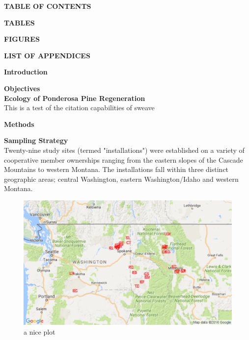 \documentclass[10pt, letterpaper, fleqn]{article}
\begin{document}
\newpage
\large 
\begin{center}
\textbf{TABLE OF CONTENTS}\\[1pt]
\end{center}
\normalsize

\newpage
\large 
\begin{center}
\textbf{TABLES}\\[1pt]
\end{center}
\normalsize
\listoftables
\normalsize

\newpage
\large 
\begin{center}
\textbf{FIGURES}\\[1pt]
\end{center}
\normalsize
\listoffigures

\newpage
\large 
\begin{center}
\textbf{LIST OF APPENDICES}\\[1pt]
\end{center}
\normalsize

\newpage
\large 
\begin{center}
\textbf{Introduction}\\[1pt]
\end{center}
\normalsize
\noindent 
{}
\textbf{Objectives}\\[1pt]
\textbf{Ecology of Ponderosa Pine Regeneration}\\[1pt]
This is a test of the citation capabilities of sweave\cite{Riegel1995a}

\newpage
\large 
\begin{center}
\textbf{Methods}\\[1pt]
\end{center}
\normalsize
\textbf{Sampling Strategy}\\[1pt]
\doublespacing
Twenty-nine study sites (termed "installations") were established on a variety of cooperative member ownerships ranging from the eastern slopes of the Cascade Mountains to western Montana. The installations fall within three distinct geographic areas; central Washington, eastern Washington/Idaho and western Montana. \\[4pt]

\begin{figure}[!h]
\begin{center}
    \includegraphics[width=.9\textwidth]{inst_map.png}
    \caption{a nice plot}
    \label{fig:mesh1}
\end{center}
\end{figure}
\end{document}
